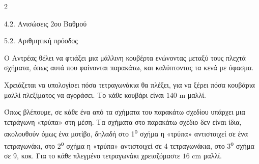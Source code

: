 \begin{ylh}{2}
    \item 4.2. Ανισώσεις 2ου Βαθμού
    \item 5.2. Αριθμητική πρόοδος
\end{ylh}

Ο Αντρέας θέλει να φτιάξει μια μάλλινη κουβέρτα ενώνοντας μεταξύ τους πλεχτά σχήματα, όπως αυτά που φαίνονται παρακάτω, και καλύπτοντας τα κενά με ύφασμα.

Χρειάζεται να υπολογίσει πόσα τετραγωνάκια θα πλέξει, για να ξέρει πόσα κουβάρια μαλλί πλεξίματος να αγοράσει. Το κάθε κουβάρι είναι $140$ m μαλλί.

Όπως βλέπουμε, σε κάθε ένα από τα σχήματα του παρακάτω σχεδίου υπάρχει μια τετράγωνη «τρύπα» στη μέση. Τα σχήματα στο παρακάτω σχέδιο δεν είναι ίδια, ακολουθούν όμως ένα μοτίβο, δηλαδή στο 1\textsuperscript{ο} σχήμα η «τρύπα» αντιστοιχεί σε ένα τετραγωνάκι, στο 2\textsuperscript{ο} σχήμα η «τρύπα» αντιστοιχεί σε 4 τετραγωνάκια, στο 3\textsuperscript{ο} σχήμα σε 9, κοκ. Για το κάθε πλεγμένο τετραγωνάκι χρειαζόμαστε $16$ cm μαλλί.

\begin{center}
\end{center}

